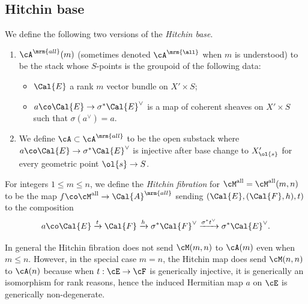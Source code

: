 \subsection{Hitchin base} \label{ss:Hit base}
\begin{defn}
\notready We define the following two versions of the \emph{Hitchin base}.
\begin{enumerate}
\item $\cA^{\mrm{all}}(m)$ (sometimes denoted $\cA^{\mrm{\all}}$ when $m$ is understood) to be the stack whose $S$-points is the groupoid of the following data:
\begin{itemize}
\item $\Cal{E}$ a rank $m$ vector bundle on $X'\times S$;
\item $a \co \Cal{E} \rightarrow \sigma^* \Cal{E}^{\vee}$ is a map of coherent sheaves on $X'\times S$ such that $\sigma(a^{\vee}) = a$.
\end{itemize}

\item We define $\cA \subset \cA^{\mrm{all}}$ to be the open substack where $a\co \Cal{E} \rightarrow \sigma^* \Cal{E}^{\vee}$ is injective after base change to $X'_{\ol{s}}$ for every geometric point $\ol{s} \rightarrow S$.
\end{enumerate}
\end{defn}

\begin{defn}
\notready For integers $1 \leq m \leq n$, we define the \emph{Hitchin fibration} for $\cM^{\rm all} = \cM^{\rm all}(m,n)$ to be the map $f \co \cM^{\rm all} \rightarrow \Cal{A}^{\mrm{all}}$ sending $(\Cal{E}, (\Cal{F},h), t)$ to
the composition
\[
a\co \Cal{E} \xrightarrow{t} \Cal{F} \xrightarrow{h} \sigma^* \Cal{F}^{\vee} \xrightarrow{\sigma^* t^{\vee}} \sigma^* \Cal{E}^{\vee}.
\]
\end{defn}



\begin{remark}
\notready\label{r:M to A}In general the Hitchin fibration does not send $\cM(m,n)$ to $\cA(m)$ even when $m\le n$. However, in the special case $m=n$,  the Hitchin map does send $\cM(n,n)$ to $\cA(n)$ because when $t:\cE\to \cF$ is generically injective, it is generically an isomorphism for rank reasons, hence the induced Hermitian map $a$ on $\cE$ is generically non-degenerate.
\end{remark}


